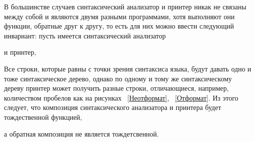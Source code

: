 \documentclass{matmex-diploma-custom}
\begin{document}




В большинстве случаев синтаксический анализатор и принтер никак не связаны между собой и являются двумя разными программами, хотя выполняют они функции, обратные друг к другу, то есть для них можно ввести следующий инвариант: пусть имеется синтаксический анализатор 

и принтер, 


Все строки, которые равны с точки зрения синтаксиса языка, будут давать одно и тоже синтаксическое дерево, однако по одному и тому же синтаксическому дереву принтер может получить разные строки, отличающиеся, например, количеством пробелов как на рисунках ~\ref{Неотформат}, ~\ref{Отформат}.
Из этого следует, что композиция синтаксического анализатора и принтера будет тождественной функцией, 

а обратная композиция не является тождетсвенной.


\end{document}

